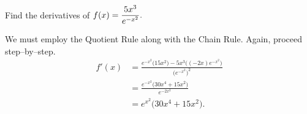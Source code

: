 \begin{example} \label{Ex:2.6.Eg6}
Find the derivatives of $\displaystyle f(x) = \frac{5x^3}{e^{-x^2}}.$

\solution
We must employ the Quotient Rule along with the Chain Rule. Again, proceed step--by--step.
\begin{align*}
f'(x) &= \frac{e^{-x^2}\big(15x^2\big) - 5x^3\big((-2x)e^{-x^2}\big)}{\big(e^{-x^2}\big)^2} \\ &=\frac{e^{-x^2}\big(30x^4+15x^2\big)}{e^{-2x^2}}\\
 &= e^{x^2}\big(30x^4+15x^2\big).
\end{align*}

	
\end{example}